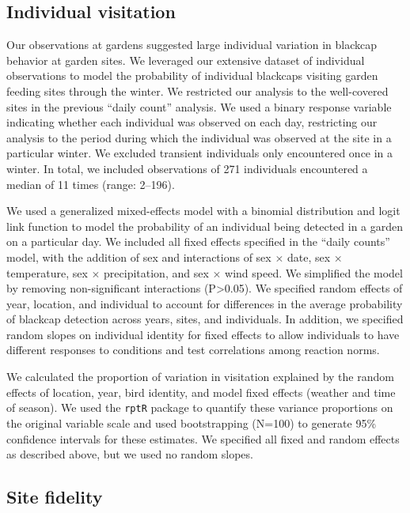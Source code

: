 \documentclass[a4paper, twoside]{templates/ociamthesis}
\begin{document}
\hypertarget{individual-visitation}{%
\subsection{Individual visitation}\label{individual-visitation}}

Our observations at gardens suggested large individual variation in blackcap behavior at garden sites. We leveraged our extensive dataset of individual observations to model the probability of individual blackcaps visiting garden feeding sites through the winter. We restricted our analysis to the well-covered sites in the previous ``daily count'' analysis. We used a binary response variable indicating whether each individual was observed on each day, restricting our analysis to the period during which the individual was observed at the site in a particular winter. We excluded transient individuals only encountered once in a winter. In total, we included observations of 271 individuals encountered a median of 11 times (range: 2--196).

We used a generalized mixed-effects model with a binomial distribution and logit link function to model the probability of an individual being detected in a garden on a particular day. We included all fixed effects specified in the ``daily counts'' model, with the addition of sex and interactions of sex \(\times\) date, sex \(\times\) temperature, sex \(\times\) precipitation, and sex \(\times\) wind speed. We simplified the model by removing non-significant interactions (P\textgreater0.05). We specified random effects of year, location, and individual to account for differences in the average probability of blackcap detection across years, sites, and individuals. In addition, we specified random slopes on individual identity for fixed effects to allow individuals to have different responses to conditions and test correlations among reaction norms.

We calculated the proportion of variation in visitation explained by the random effects of location, year, bird identity, and model fixed effects (weather and time of season). We used the \texttt{rptR} package \autocite{stoffelRptRRepeatabilityEstimation2017} to quantify these variance proportions on the original variable scale and used bootstrapping (N=100) to generate 95\% confidence intervals for these estimates. We specified all fixed and random effects as described above, but we used no random slopes.

\hypertarget{site-fidelity}{%
\subsection{Site fidelity}\label{site-fidelity}}
\end{document}
